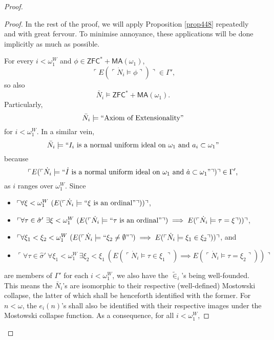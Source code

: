 \documentclass[12pt]{article}
\numberwithin{equation}{section}
\begin{document}
\begin{proof}
\begin{proof}
In the rest of the proof, we will apply Proposition \ref{prop448} repeatedly and with great fervour. To minimise annoyance, these applications will be done implicitly as much as possible. 

For every $i < \omega_1^W$ and $\phi \in \mathsf{ZFC}^* + \mathsf{MA}(\omega_1)$, 
\begin{equation*}
    \ulcorner E(\ulcorner \dot{N}_i \models \phi \urcorner) \urcorner \in \Gamma' \text{,}
\end{equation*}
so also 
\begin{equation*}
    \bar{N}_i \models \mathsf{ZFC}^* + \mathsf{MA}(\omega_1) \text{.}
\end{equation*}
Particularly, 
\begin{equation*}
    \bar{N}_i \models ``\text{Axiom of Extensionality}"
\end{equation*}
for $i < \omega_1^W$. In a similar vein, 
\begin{equation*}
    \bar{N}_i \models ``I_i \text{ is a normal uniform ideal on } \omega_1 \text{ and } a_i \subset \omega_1" 
\end{equation*}
because
\begin{equation*}
    \ulcorner E(\ulcorner \dot{N}_i \models ``\dot{I} \text{ is a normal uniform ideal on } \omega_1 \text{ and } \dot{a} \subset \omega_1" \urcorner) \urcorner \in \Gamma' \text{,}
\end{equation*}
as $i$ ranges over $\omega_1^W$. Since
\begin{itemize}
    \item $\ulcorner \forall \xi < \omega_1^W \ (E(\ulcorner \dot{N}_i \models ``\xi \text{ is an ordinal}" \urcorner)) \urcorner$,
    \item $\ulcorner \forall \tau \in \hat{\sigma}' \ \exists \xi < \omega_1^W \ (E(\ulcorner \dot{N}_i \models ``\tau \text{ is an ordinal}" \urcorner) \implies E(\ulcorner \dot{N}_i \models \tau = \xi \urcorner)) \urcorner$,
    \item $\ulcorner \forall \xi_1 < \xi_2 < \omega_1^W \ (E(\ulcorner \dot{N}_i \models ``\xi_2 \neq \emptyset" \urcorner) \implies E(\ulcorner \dot{N}_i \models \xi_1 \in \xi_2 \urcorner)) \urcorner$, and
    \item $\ulcorner \forall \tau \in \hat{\sigma}' \ \forall \xi_1 < \omega_1^W \ \exists \xi_2 < \xi_1 \ (E(\ulcorner \dot{N}_i \models \tau \in \xi_1  \urcorner) \implies E(\ulcorner \dot{N}_i \models \tau = \xi_2 \urcorner)) \urcorner$
\end{itemize}
are members of $\Gamma'$ for each $i < \omega_1^W$, we also have the $\tilde{\in}_i$'s being well-founded. This means the $\bar{N}_i$'s are isomorphic to their respective (well-defined) Mostowski collapse, the latter of which shall be henceforth identified with the former. For $n < \omega$, the $e_i(n)$'s shall also be identified with their respective images under the Mostowski collapse function. As a consequence, for all $i < \omega_1^W$,

\end{proof}
\end{proof}
\end{document}

